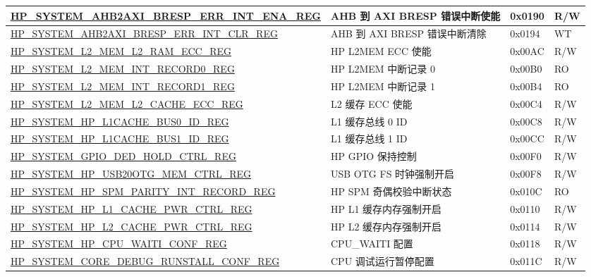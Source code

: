 \begin{longtable}{ | L{8.5cm} | L{6cm} | l | L{1.2cm} | }
\hyperref[regdesc:HPSYSTEMAHB2AXIBRESPERRINTENAREG]{HP\_SYSTEM\_AHB2AXI\_BRESP\_ERR\_INT\_ENA\_REG} & AHB 到 AXI BRESP 错误中断使能 & 0x0190 & R/W \\ \hline
\hyperref[regdesc:HPSYSTEMAHB2AXIBRESPERRINTCLRREG]{HP\_SYSTEM\_AHB2AXI\_BRESP\_ERR\_INT\_CLR\_REG} & AHB 到 AXI BRESP 错误中断清除 & 0x0194 & WT \\ \hline
\hyperref[regdesc:HPSYSTEML2MEML2RAMECCREG]{HP\_SYSTEM\_L2\_MEM\_L2\_RAM\_ECC\_REG} & HP L2MEM ECC 使能 & 0x00AC & R/W \\ \hline
\hyperref[regdesc:HPSYSTEML2MEMINTRECORD0REG]{HP\_SYSTEM\_L2\_MEM\_INT\_RECORD0\_REG} & HP L2MEM 中断记录 0 & 0x00B0 & RO \\ \hline
\hyperref[regdesc:HPSYSTEML2MEMINTRECORD1REG]{HP\_SYSTEM\_L2\_MEM\_INT\_RECORD1\_REG} & HP L2MEM 中断记录 1 & 0x00B4 & RO \\ \hline
\hyperref[regdesc:HPSYSTEML2MEML2CACHEECCREG]{HP\_SYSTEM\_L2\_MEM\_L2\_CACHE\_ECC\_REG} & L2 缓存 ECC 使能 & 0x00C4 & R/W \\ \hline
\hyperref[regdesc:HPSYSTEMHPL1CACHEBUS0IDREG]{HP\_SYSTEM\_HP\_L1CACHE\_BUS0\_ID\_REG} & L1 缓存总线 0 ID & 0x00C8 & R/W \\ \hline
\hyperref[regdesc:HPSYSTEMHPL1CACHEBUS1IDREG]{HP\_SYSTEM\_HP\_L1CACHE\_BUS1\_ID\_REG} & L1 缓存总线 1 ID & 0x00CC & R/W \\ \hline
\hyperref[regdesc:HPSYSTEMGPIODEDHOLDCTRLREG]{HP\_SYSTEM\_GPIO\_DED\_HOLD\_CTRL\_REG} & HP GPIO 保持控制 & 0x00F0 & R/W \\ \hline
\hyperref[regdesc:HPSYSTEMHPUSB20OTGMEMCTRLREG]{HP\_SYSTEM\_HP\_USB20OTG\_MEM\_CTRL\_REG} & USB OTG FS 时钟强制开启 & 0x00F8 & R/W \\ \hline
\hyperref[regdesc:HPSYSTEMHPSPMPARITYINTRECORDREG]{HP\_SYSTEM\_HP\_SPM\_PARITY\_INT\_RECORD\_REG} & HP SPM 奇偶校验中断状态 & 0x010C & RO \\ \hline
\hyperref[regdesc:HPSYSTEMHPL1CACHEPWRCTRLREG]{HP\_SYSTEM\_HP\_L1\_CACHE\_PWR\_CTRL\_REG} & HP L1 缓存内存强制开启 & 0x0110 & R/W \\ \hline
\hyperref[regdesc:HPSYSTEMHPL2CACHEPWRCTRLREG]{HP\_SYSTEM\_HP\_L2\_CACHE\_PWR\_CTRL\_REG} & HP L2 缓存内存强制开启 & 0x0114 & R/W \\ \hline
\hyperref[regdesc:HPSYSTEMHPCPUWAITICONFREG]{HP\_SYSTEM\_HP\_CPU\_WAITI\_CONF\_REG} & CPU\_WAITI 配置 & 0x0118 & R/W \\ \hline
\hyperref[regdesc:HPSYSTEMCOREDEBUGRUNSTALLCONFREG]{HP\_SYSTEM\_CORE\_DEBUG\_RUNSTALL\_CONF\_REG} & CPU 调试运行暂停配置 & 0x011C & R/W \\ \hline

\end{longtable}

